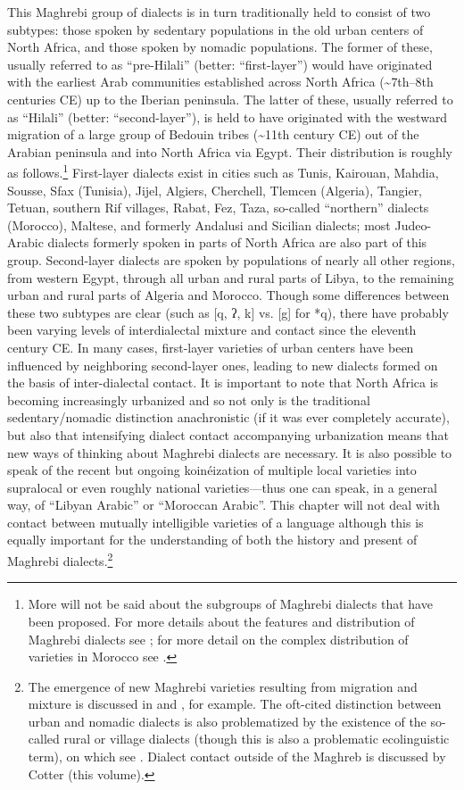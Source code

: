 \documentclass[output=paper]{langsci/langscibook}
\begin{document}
This Maghrebi group of dialects is in turn traditionally held to consist of two subtypes: those spoken by sedentary populations in the old urban centers of North Africa, and those spoken by nomadic populations. The former of these, usually referred to as “pre-Hilali” (better: “first-layer”) would have originated with the earliest Arab communities established across North Africa ({\textasciitilde}7th--8th centuries CE) up to the Iberian peninsula. The latter of these, usually referred to as “Hilali” (better: “second-layer”), is held to have originated with the westward migration of a large group of Bedouin tribes ({\textasciitilde}11th century CE) out of the Arabian peninsula and into North Africa via Egypt. Their distribution is roughly as follows.\footnote{More will not be said about the subgroups of Maghrebi dialects that have been proposed. For more details about the features and distribution of Maghrebi dialects see \citet{Pereira2011}; for more detail on the complex distribution of varieties in Morocco see \citet{Heath2002}.} First-layer dialects exist in cities such as Tunis, Kairouan, Mahdia, Sousse, Sfax (Tunisia), Jijel, Algiers, Cherchell, Tlemcen (Algeria), Tangier, Tetuan, southern Rif villages, Rabat, Fez, Taza, so-called “northern” dialects (Morocco), Maltese, and formerly Andalusi and Sicilian dialects; most Judeo-Arabic dialects formerly spoken in parts of North Africa are also part of this group. Second-layer dialects are spoken by populations of nearly all other regions, from western Egypt, through all urban and rural parts of Libya, to the remaining urban and rural parts of Algeria and Morocco. Though some differences between these two subtypes are clear (such as [q, ʔ, k] vs. [g] for *q), there have probably been varying levels of interdialectal mixture and contact since the eleventh century CE. In many cases, first-layer varieties of urban centers have been influenced by neighboring second-layer ones, leading to new dialects formed on the basis of inter-dialectal contact. It is important to note that North Africa is becoming increasingly urbanized and so not only is the traditional sedentary/nomadic distinction anachronistic (if it was ever completely accurate), but also that intensifying dialect contact accompanying urbanization means that new ways of thinking about Maghrebi dialects are necessary. It is also possible to speak of the recent but ongoing koinéization of multiple local varieties into supralocal or even roughly national varieties—thus one can speak, in a general way, of “Libyan Arabic” or “Moroccan Arabic”. This chapter will not deal with contact between mutually intelligible varieties of a language although this is equally important for the understanding of both the history and present of Maghrebi dialects.\footnote{The emergence of new Maghrebi varieties resulting from migration and mixture is discussed in \citet{Pereira2007} and \citet{Gibson2002}, for example. The oft-cited distinction between urban and nomadic dialects is also problematized by the existence of the so-called rural or village dialects (though this is also a problematic ecolinguistic term), on which see \citet{Mion2015}. Dialect contact outside of the Maghreb is discussed by Cotter (this volume).}
\end{document}
